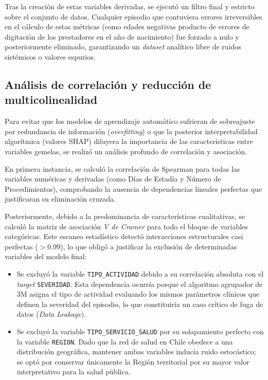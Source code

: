 Tras la creación de estas variables derivadas, se ejecutó un filtro final y estricto sobre el conjunto de datos. Cualquier episodio que contuviera errores irreversibles en el cálculo de estas métricas (como edades negativas producto de errores de digitación de los prestadores en el año de nacimiento) fue forzado a nulo y posteriormente eliminado, garantizando un \textit{dataset} analítico libre de ruidos sistémicos o valores espurios.

\subsection{Análisis de correlación y reducción de multicolinealidad}
Para evitar que los modelos de aprendizaje automático sufrieran de sobreajuste por redundancia de información (\textit{overfitting}) o que la posterior interpretabilidad algorítmica (valores SHAP) diluyera la importancia de las características entre variables gemelas, se realizó un análisis profundo de correlación y asociación.

En primera instancia, se calculó la correlación de Spearman para todas las variables numéricas y derivadas (como Días de Estadía y Número de Procedimientos), comprobando la ausencia de dependencias lineales perfectas que justificaran su eliminación cruzada.

Posteriormente, debido a la predominancia de características cualitativas, se calculó la matriz de asociación \textit{V de Cramer} para todo el bloque de variables categóricas. Este escaneo estadístico detectó interacciones estructurales casi perfectas ($>0.99$), lo que obligó a justificar la exclusión de determinadas variables del modelo final:
\begin{itemize}
    \item Se excluyó la variable \texttt{TIPO\_ACTIVIDAD} debido a su correlación absoluta con el \textit{target} \texttt{SEVERIDAD}. Esta dependencia ocurría porque el algoritmo agrupador de 3M asigna el tipo de actividad evaluando los mismos parámetros clínicos que definen la severidad del episodio, lo que constituiría un caso crítico de fuga de datos (\textit{Data Leakage}).
    \item Se excluyó la variable \texttt{TIPO\_SERVICIO\_SALUD} por su solapamiento perfecto con la variable \texttt{REGION}. Dado que la red de salud en Chile obedece a una distribución geográfica, mantener ambas variables inducía ruido estocástico; se optó por conservar únicamente la Región territorial por su mayor valor interpretativo para la salud pública.
\end{itemize}

